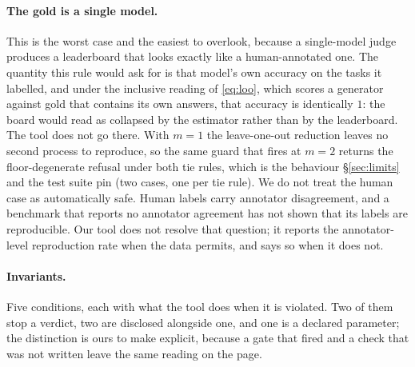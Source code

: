 \documentclass{article}
\begin{document}
\paragraph{The gold is a single model.} This is the worst case and the easiest to overlook, because a single-model judge produces a leaderboard that looks exactly like a human-annotated one. The quantity this rule would ask for is that model's own accuracy on the tasks it labelled, and under the inclusive reading of \eqref{eq:loo}, which scores a generator against gold that contains its own answers, that accuracy is identically $1$: the board would read as collapsed by the estimator rather than by the leaderboard. The tool does not go there. With $m=1$ the leave-one-out reduction leaves no second process to reproduce, so the same guard that fires at $m=2$ returns the floor-degenerate refusal under both tie rules, which is the behaviour \S\ref{sec:limits} and the test suite pin (two cases, one per tie rule). We do not treat the human case as automatically safe. Human labels carry annotator disagreement, and a benchmark that reports no annotator agreement has not shown that its labels are reproducible. Our tool does not resolve that question; it reports the annotator-level reproduction rate when the data permits, and says so when it does not.

\paragraph{Invariants.} Five conditions, each with what the tool does when it is violated. Two of them stop a verdict, two are disclosed alongside one, and one is a declared parameter; the distinction is ours to make explicit, because a gate that fired and a check that was not written leave the same reading on the page.
\end{document}
